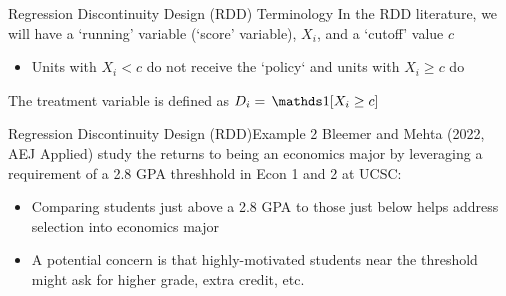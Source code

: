 \documentclass[aspectratio=169,t,11pt,table]{beamer}
\begin{document}

\begin{frame}{Regression Discontinuity Design (RDD) Terminology}{}
  In the RDD literature, we will have a \alert{`running' variable} (`score' variable), $X_i$, and a \alert{`cutoff'} value $c$
  \begin{itemize}
    \item Units with $X_i < c$ do not receive the `policy` and units with $X_i 
    \geq c$ do
  \end{itemize}

  \bigskip 
  The treatment variable is defined as $D_i = \one{X_i \geq c}$
\end{frame}

\begin{frame}{Regression Discontinuity Design (RDD)}{Example 2}
  Bleemer and Mehta (2022, AEJ Applied) study the returns to being an economics major by leveraging a requirement of a 2.8 GPA threshhold in Econ 1 and 2 at UCSC:

  \begin{itemize}
    \item Comparing students just above a 2.8 GPA to those just below helps address selection into economics major
    
    \item A potential concern is that highly-motivated students near the threshold might ask for higher grade, extra credit, etc.
  \end{itemize}
\end{frame}
\end{document}
